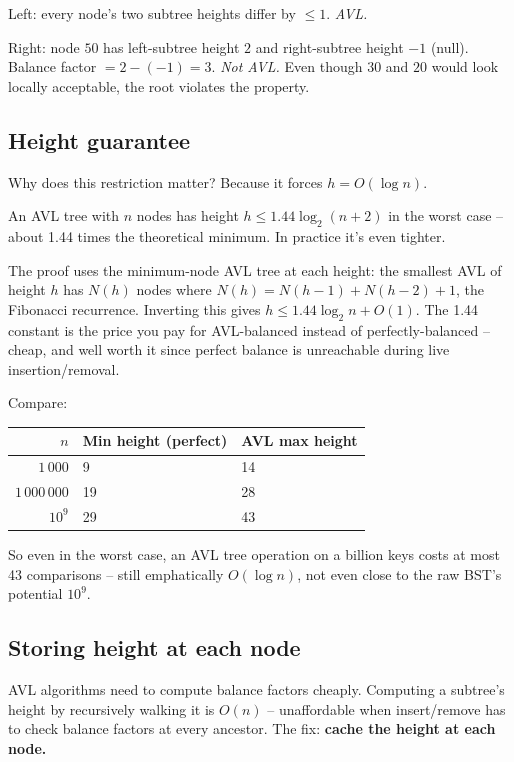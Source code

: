 \documentclass[11pt]{article}
\begin{document}
Left: every node's two subtree heights differ by $\le 1$. \emph{AVL.}

Right: node $50$ has left-subtree height $2$ and right-subtree height $-1$ (null). Balance factor $= 2 - (-1) = 3$. \emph{Not AVL.} Even though $30$ and $20$ would look locally acceptable, the root violates the property.

\subsection*{Height guarantee}

Why does this restriction matter? Because it forces $h = O(\log n)$.

\begin{defnbox}
An AVL tree with $n$ nodes has height $h \le 1.44 \log_2(n+2)$ in the worst case -- about 1.44 times the theoretical minimum. In practice it's even tighter.
\end{defnbox}

The proof uses the minimum-node AVL tree at each height: the smallest AVL of height $h$ has $N(h)$ nodes where $N(h) = N(h-1) + N(h-2) + 1$, the Fibonacci recurrence. Inverting this gives $h \le 1.44 \log_2 n + O(1)$. The 1.44 constant is the price you pay for AVL-balanced instead of perfectly-balanced -- cheap, and well worth it since perfect balance is unreachable during live insertion/removal.

Compare:
\begin{center}
\begin{tabular}{rll}
$n$ & Min height (perfect) & AVL max height \\
\hline
$1\,000$        & 9  & 14 \\
$1\,000\,000$   & 19 & 28 \\
$10^9$          & 29 & 43 \\
\end{tabular}
\end{center}

So even in the worst case, an AVL tree operation on a billion keys costs at most 43 comparisons -- still emphatically $O(\log n)$, not even close to the raw BST's potential $10^9$.

\subsection*{Storing height at each node}

AVL algorithms need to compute balance factors cheaply. Computing a subtree's height by recursively walking it is $O(n)$ -- unaffordable when insert/remove has to check balance factors at every ancestor. The fix: \textbf{cache the height at each node.}
\end{document}
